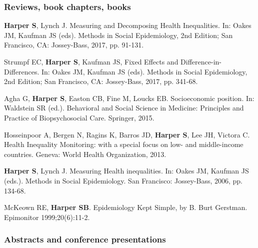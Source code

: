 \documentclass[
  letterpaper,
  DIV=11,
  numbers=noendperiod]{scrartcl}
\begin{document}
\subsubsection{Reviews, book chapters,
books}\label{reviews-book-chapters-books}

\begin{etaremune}

\item \textbf{Harper S}, Lynch J. Measuring and Decomposing Health Inequalities. In: Oakes JM, Kaufman JS (eds).  Methods in Social Epidemiology, 2nd Edition; San Francisco, CA: Jossey-Bass, 2017, pp. 91-131.

\item Strumpf EC, \textbf{Harper S}, Kaufman JS, Fixed Effects and Difference-in-Differences. In: Oakes JM, Kaufman JS (eds).  Methods in Social Epidemiology, 2nd Edition; San Francisco, CA: Jossey-Bass, 2017, pp. 341-68.

\item   Agha G, \textbf{Harper S}, Easton CB, Fine M, Loucks EB. Socioeconomic position. In: Waldstein SR (ed.). Behavioral and Social Science in Medicine: Principles and Practice of Biopsychosocial Care. Springer, 2015.

\item Hosseinpoor A, Bergen N, Ragins K, Barros JD, \textbf{Harper S}, Lee JH, Victora C. Health Inequality Monitoring: with a special focus on low- and middle-income countries. Geneva: World Health Organization, 2013. 

\item \textbf{Harper S}, Lynch J.  Measuring Health inequalities.  In: Oakes JM, Kaufman JS (eds.).  Methods in Social Epidemiology. San Francisco: Jossey-Bass, 2006, pp. 134-68.

\item McKeown RE, \textbf{Harper SB}.  Epidemiology Kept Simple, by B. Burt Gerstman. Epimonitor 1999;20(6):11-2.

\end{etaremune}

\subsubsection{Abstracts and conference
presentations}\label{abstracts-and-conference-presentations}
\end{document}
